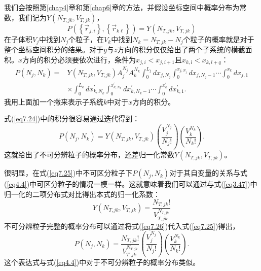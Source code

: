 \documentclass[UTF8]{ctexart}
\numberwithin{equation}{section}%
\numberwithin{figure}{section}%
\begin{document}
    我们会按照第\ref{chap4}章和第\ref{chap6}章的方法，并假设坐标空间中概率分布为常数，我们记为$Y(N_{T,jk},V_{T,jk})$，
    \begin{equation}
        P\left(\left\{\vec{r}_{j, i}\right\},\left\{\vec{r}_{k \ell}\right\}\right)=Y\left(N_{T, j k}, V_{T, j k}\right)
    \end{equation}
    在子体积$V_j$中找到$N_j$个粒子，在$V_k$中找到$N_k=N_{T,jk}-N_j$个粒子的概率就是对于整个坐标空间积分的结果。对于$y$与$z$方向的积分仅仅给出了两个子系统的横截面积。$x$方向的积分必须要依次进行，条件为$x_{j,i}<x_{j,i+1}$且$x_{k,l}<x_{k,l+q}$：
    \begin{equation}\label{eq7.24}
        \begin{aligned}
            P\left(N_{j}, N_{k}\right)=& Y\left(N_{T, j k}, V_{T, j k}\right) A_{j}^{N_{j}} A_{k}^{N_{k}} \int_{0}^{L_{j}} d x_{j, N_{j}} \int_{0}^{x_{j, N_{j}}} d x_{j, N_{j}-1} \cdots \int_{0}^{x_{k}} d x_{j, 1} \\
            & \times \int_{0}^{L_{k}} d x_{k, N_{k}}^{\prime} \int_{0}^{x_{k, N_{k}}^{\prime}} d x_{k, N_{k}-1}^{\prime} \cdots \int_{0}^{x_{k}^{\prime}} d x_{k, 1}^{\prime} .
            \end{aligned}
    \end{equation}
    我用上面加一个撇来表示子系统$k$中对于$x$方向的积分。

    式(\ref{eq7.24})中的积分很容易通过迭代得到：
    \begin{equation}\label{eq7.25}
        P\left(N_{j}, N_{k}\right)=Y\left(N_{T, j k}, V_{T, j k}\right)\left(\frac{V_{j}^{N_{j}}}{N_{j} !}\right)\left(\frac{V_{k}^{N_{k}}}{N_{k} !}\right) .
    \end{equation}
    这就给出了不可分辨粒子的概率分布，还差归一化常数$Y\left(N_{T, j k}, V_{T, j k}\right)$。

    很明显，在式(\ref{eq7.25})中不可区分粒子下$P(N_j,N_k)$对于其自变量的关系与式(\ref{eq4.4})中可区分粒子的情况一模一样。这就意味着我们可以通过与式(\ref{eq3.47})中归一化的二项分布式对比得出本式的归一化系数：
    \begin{equation}\label{eq7.26}
        Y\left(N_{T, j k}, V_{T, j k}\right)=\frac{N_{T, j k} !}{V_{T, j k}^{N_{T, j k}}}
    \end{equation}
    不可分辨粒子完整的概率分布可以通过将式(\ref{eq7.26})代入式(\ref{eq7.25})得出，
    \begin{equation}
        P\left(N_{j}, N_{k}\right)=\frac{N_{T, j k} !}{V_{T, j k}^{N_{T, j k}}}\left(\frac{V_{j}^{N_{j}}}{N_{j} !}\right)\left(\frac{V_{k}^{N_{k}}}{N_{k} !}\right) .
    \end{equation}
    这个表达式与式(\ref{eq4.4})中对于不可分辨粒子的概率分布类似。
\end{document}

